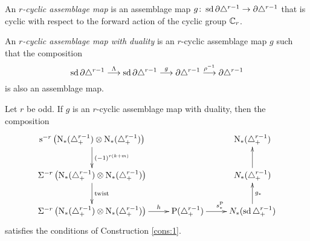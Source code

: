 \begin{definition}
	An \emph{$r$-cyclic assemblage map} is an assemblage map $g \colon \operatorname{sd} \partial \triangle^{r-1} \to \partial \triangle^{r-1}$ that is cyclic with respect to the forward action of the cyclic group $\mathbb{C}_{r}$.
\end{definition}

\begin{definition}
	An \emph{$r$-cyclic assemblage map with duality} is an $r$-cyclic assemblage map $g$ such that the composition
	\[\operatorname{sd} \partial \triangle^{r-1} \overset{\Lambda}{\longrightarrow} \operatorname{sd} \partial\triangle^{r-1} \overset{g}{\longrightarrow} \partial\triangle^{r-1}\overset{\rho^{-1}}{\longrightarrow} \partial\triangle^{r-1} \]
	is also an assemblage map.
\end{definition}

\begin{proposition}\label{prop:assemblage}
	Let $r$ be odd. If $g$ is an $r$-cyclic assemblage map with duality, then the composition
	\[
	\xymatrix{
		\sus{-r}\left(\chains(\asimplex^{r-1}) \ot \chains(\asimplex^{r-1})\right)\ar[d]^{(-1)^{r(k+m)}}&&
		\chains(\asimplex^{r-1})
		\\
		\susp{-r}\left(\chains(\asimplex^{r-1}) \ot \chains(\asimplex^{r-1})\right)\ar[d]^-{\twist} &&
		\cadenas(\asimplex^{r-1})\ar[u]
		\\
		\susp{-r}\left(\chains(\asimplex^{r-1}) \ot \chains(\asimplex^{r-1})\right)\ar[r]^-{h} &
		\Psd(\asimplex^{r-1}) \ar[r]^{s_*^{\Psd}} &
		\cadenas(\sd\asimplex^{r-1})\ar[u]_{g_*}
		}
	\]
	satisfies the conditions of Construction \ref{cons:1}.
\end{proposition}

